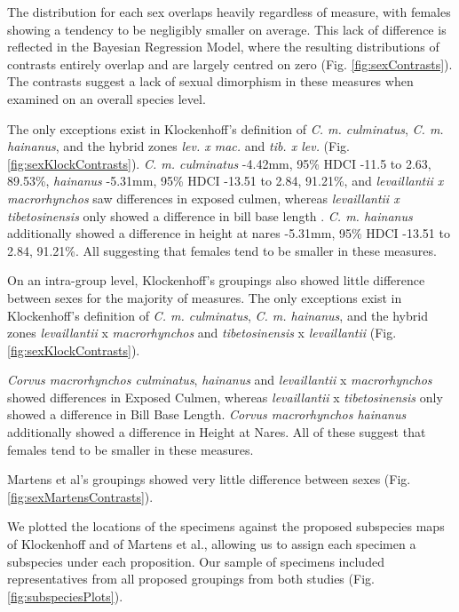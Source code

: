 \documentclass[10pt,a4paper]{article}
\begin{document}
The distribution for each sex overlaps heavily regardless of measure, with females showing a tendency to be negligibly smaller on average.
This lack of difference is reflected in the Bayesian Regression Model, where the resulting distributions of contrasts entirely overlap and are largely centred on zero (Fig. \ref{fig:sexContrasts}).
The contrasts suggest a lack of sexual dimorphism in these measures when examined on an overall species level.

The only exceptions exist in Klockenhoff's definition of \emph{C. m. culminatus}, \emph{C. m. hainanus}, and the hybrid zones \emph{lev. x mac.} and \emph{tib. x lev.} (Fig. \ref{fig:sexKlockContrasts}).
\emph{C. m. culminatus} -4.42mm, 95\% HDCI -11.5 to 2.63, 89.53\%, \emph{hainanus} -5.31mm, 95\% HDCI -13.51 to 2.84, 91.21\%, and \emph{levaillantii x macrorhynchos} saw differences in exposed culmen, whereas \emph{levaillantii x tibetosinensis} only showed a difference in bill base length .
\emph{C. m. hainanus} additionally showed a difference in height at nares -5.31mm, 95\% HDCI -13.51 to 2.84, 91.21\%.
All suggesting that females tend to be smaller in these measures.

On an intra-group level, Klockenhoff's groupings also showed little difference between sexes for the majority of measures.
The only exceptions exist in Klockenhoff's definition of \emph{C. m. culminatus}, \emph{C. m. hainanus}, and the hybrid zones \emph{levaillantii} x \emph{macrorhynchos} and \emph{tibetosinensis} x \emph{levaillantii} (Fig. \ref{fig:sexKlockContrasts}).

\emph{Corvus macrorhynchos culminatus}, \emph{hainanus} and \emph{levaillantii} x \emph{macrorhynchos} showed differences in Exposed Culmen, whereas \emph{levaillantii} x \emph{tibetosinensis} only showed a difference in Bill Base Length.
\emph{Corvus macrorhynchos hainanus} additionally showed a difference in Height at Nares.
All of these suggest that females tend to be smaller in these measures.

Martens et al's groupings showed very little difference between sexes (Fig. \ref{fig:sexMartensContrasts}).

We plotted the locations of the specimens against the proposed subspecies maps of Klockenhoff and of Martens et al., allowing us to assign each specimen a subspecies under each proposition.
Our sample of specimens included representatives from all proposed groupings from both studies (Fig. \ref{fig:subspeciesPlots}).
\end{document}
